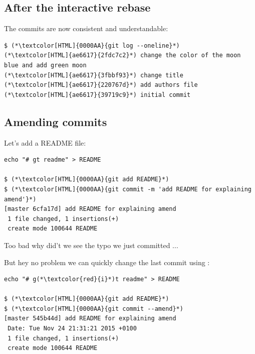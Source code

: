 \subsection{After the interactive rebase}
\begin{frame}[fragile]
  \subslidetitle

  The commits are now consistent and understandable:
  \begin{lstlisting}
$ (*\textcolor[HTML]{0000AA}{git log --oneline}*)
(*\textcolor[HTML]{ae6617}{2fdc7c2}*) change the color of the moon blue and add green moon
(*\textcolor[HTML]{ae6617}{3fbbf93}*) change title
(*\textcolor[HTML]{ae6617}{220767d}*) add authors file
(*\textcolor[HTML]{ae6617}{39719c9}*) initial commit
\end{lstlisting}

\end{frame}


\subsection{Amending commits}
\begin{frame}[fragile]
  \subslidetitle

  Let's add a README file:

 \begin{lstlisting}
echo "# gt readme" > README

$ (*\textcolor[HTML]{0000AA}{git add README}*)
$ (*\textcolor[HTML]{0000AA}{git commit -m 'add README for explaining amend'}*)
[master 6cfa17d] add README for explaining amend
 1 file changed, 1 insertions(+)
 create mode 100644 README
 \end{lstlisting}

 Too bad why did't we see the typo we just committed ...

 But hey no problem we can quickly change the last commit using :

 \begin{lstlisting}
echo "# g(*\textcolor{red}{i}*)t readme" > README

$ (*\textcolor[HTML]{0000AA}{git add README}*)
$ (*\textcolor[HTML]{0000AA}{git commit --amend}*)
[master 545b44d] add README for explaining amend
 Date: Tue Nov 24 21:31:21 2015 +0100
 1 file changed, 1 insertions(+)
 create mode 100644 README
 \end{lstlisting}

\end{frame}

